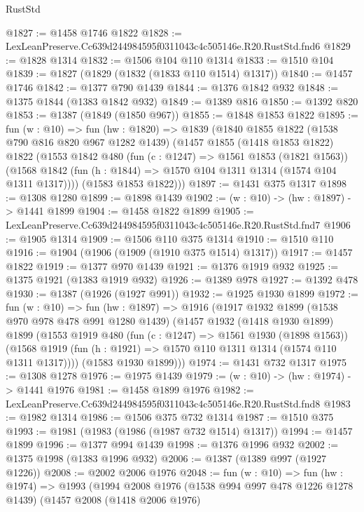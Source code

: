 \begin{lexlean}{RustStd}
\begin{coremodule}
@1827 := @1458 @1746 @1822
@1828 := LexLeanPreserve.Cc639d244984595f0311043c4c505146e.R20.RustStd.fnd6
@1829 := @1828 @1314
@1832 := @1506 @104 @110 @1314
@1833 := @1510 @104
@1839 := @1827 (@1829 (@1832 (@1833 @110 @1514) @1317))
@1840 := @1457 @1746
@1842 := @1377 @790 @1439
@1844 := @1376 @1842 @932
@1848 := @1375 @1844 (@1383 @1842 @932)
@1849 := @1389 @816
@1850 := @1392 @820
@1853 := @1387 (@1849 (@1850 @967))
@1855 := @1848 @1853 @1822
@1895 := fun (w : @10) =>
  fun (hw : @1820) =>
  @1839
    (@1840
      @1855
      @1822
      (@1538 @790 @816 @820 @967 @1282 @1439)
      (@1457
        @1855
        (@1418 @1853 @1822)
        @1822
        (@1553
          @1842
          @480
          (fun (c : @1247) => @1561 @1853 (@1821 @1563))
          (@1568 @1842 (fun (h : @1844) => @1570 @104 @1311 @1314 (@1574 @104 @1311 @1317))))
        (@1583 @1853 @1822)))
@1897 := @1431 @375 @1317
@1898 := @1308 @1280
@1899 := @1898 @1439
@1902 := (w : @10) -> (hw : @1897) -> @1441 @1899
@1904 := @1458 @1822 @1899
@1905 := LexLeanPreserve.Cc639d244984595f0311043c4c505146e.R20.RustStd.fnd7
@1906 := @1905 @1314
@1909 := @1506 @110 @375 @1314
@1910 := @1510 @110
@1916 := @1904 (@1906 (@1909 (@1910 @375 @1514) @1317))
@1917 := @1457 @1822
@1919 := @1377 @970 @1439
@1921 := @1376 @1919 @932
@1925 := @1375 @1921 (@1383 @1919 @932)
@1926 := @1389 @978
@1927 := @1392 @478
@1930 := @1387 (@1926 (@1927 @991))
@1932 := @1925 @1930 @1899
@1972 := fun (w : @10) =>
  fun (hw : @1897) =>
  @1916
    (@1917
      @1932
      @1899
      (@1538 @970 @978 @478 @991 @1280 @1439)
      (@1457
        @1932
        (@1418 @1930 @1899)
        @1899
        (@1553
          @1919
          @480
          (fun (c : @1247) => @1561 @1930 (@1898 @1563))
          (@1568 @1919 (fun (h : @1921) => @1570 @110 @1311 @1314 (@1574 @110 @1311 @1317))))
        (@1583 @1930 @1899)))
@1974 := @1431 @732 @1317
@1975 := @1308 @1278
@1976 := @1975 @1439
@1979 := (w : @10) -> (hw : @1974) -> @1441 @1976
@1981 := @1458 @1899 @1976
@1982 := LexLeanPreserve.Cc639d244984595f0311043c4c505146e.R20.RustStd.fnd8
@1983 := @1982 @1314
@1986 := @1506 @375 @732 @1314
@1987 := @1510 @375
@1993 := @1981 (@1983 (@1986 (@1987 @732 @1514) @1317))
@1994 := @1457 @1899
@1996 := @1377 @994 @1439
@1998 := @1376 @1996 @932
@2002 := @1375 @1998 (@1383 @1996 @932)
@2006 := @1387 (@1389 @997 (@1927 @1226))
@2008 := @2002 @2006 @1976
@2048 := fun (w : @10) =>
  fun (hw : @1974) =>
  @1993
    (@1994
      @2008
      @1976
      (@1538 @994 @997 @478 @1226 @1278 @1439)
      (@1457
        @2008
        (@1418 @2006 @1976)

\end{coremodule}
\end{lexlean}
